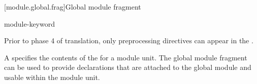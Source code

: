 [module.global.frag]{Global module fragment}

\begin{bnf}
\br
    module-keyword \terminal{;} 
\end{bnf}

\pnum
\begin{note}
Prior to phase 4 of translation,
only preprocessing directives can appear
in the .
\end{note}

\pnum
A  specifies the contents of the
 for a module unit.
The global module fragment can be used to provide declarations
that are attached to the global module and usable within the module unit.


